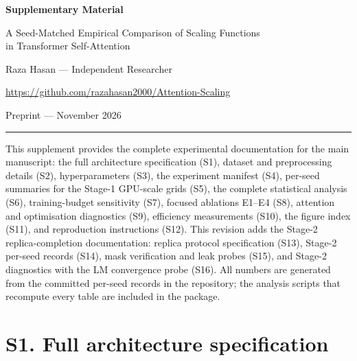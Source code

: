 \documentclass[10pt,a4paper]{article}
\begin{document}
\begin{center}
  {\LARGE\bfseries Supplementary Material\\[6pt]}
  {\large A Seed-Matched Empirical Comparison of Scaling Functions\\[3pt]
   in Transformer Self-Attention\par}
  \vspace{12pt}
  {\normalsize Raza Hasan --- Independent Researcher\par}
  \vspace{3pt}
  {\small\url{https://github.com/razahasan2000/Attention-Scaling}\par}
  \vspace{6pt}
  {\small Preprint --- November 2026\par}
\end{center}
\vspace{4pt}
\noindent\rule{\textwidth}{0.4pt}

\noindent This supplement provides the complete experimental documentation for
the main manuscript: the full architecture specification (S1), dataset and
preprocessing details (S2), hyperparameters (S3), the experiment manifest (S4),
per-seed summaries for the Stage-1 GPU-scale grids (S5), the complete
statistical analysis (S6), training-budget sensitivity (S7), focused ablations
E1--E4 (S8), attention and optimisation diagnostics (S9), efficiency
measurements (S10), the figure index (S11), and reproduction instructions
(S12). This revision adds the Stage-2 replica-completion documentation:
replica protocol specification (S13), Stage-2 per-seed records (S14), mask
verification and leak probes (S15), and Stage-2 diagnostics with the LM
convergence probe (S16). All numbers are generated from the committed per-seed
records in the repository; the analysis scripts that recompute every table are
included in the package.

\section*{S1. Full architecture specification}\label{sup:arch}
\end{document}
